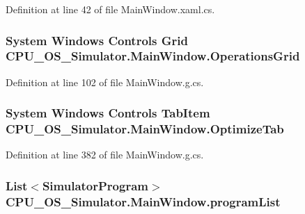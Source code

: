 Definition at line 42 of file Main\+Window.\+xaml.\+cs.

\hypertarget{class_c_p_u___o_s___simulator_1_1_main_window_ae4f2459995eb2f672c0fd3c2248b79fd}{}
\subsubsection[{Operations\+Grid}]{\setlength{\rightskip}{0pt plus 5cm}System Windows Controls Grid C\+P\+U\+\_\+\+O\+S\+\_\+\+Simulator.\+Main\+Window.\+Operations\+Grid\hspace{0.3cm}{\ttfamily [package]}}\label{class_c_p_u___o_s___simulator_1_1_main_window_ae4f2459995eb2f672c0fd3c2248b79fd}


Definition at line 102 of file Main\+Window.\+g.\+cs.

\hypertarget{class_c_p_u___o_s___simulator_1_1_main_window_a47b1359d9e96abf2b0935eb3392405d4}{}
\subsubsection[{Optimize\+Tab}]{\setlength{\rightskip}{0pt plus 5cm}System Windows Controls Tab\+Item C\+P\+U\+\_\+\+O\+S\+\_\+\+Simulator.\+Main\+Window.\+Optimize\+Tab\hspace{0.3cm}{\ttfamily [package]}}\label{class_c_p_u___o_s___simulator_1_1_main_window_a47b1359d9e96abf2b0935eb3392405d4}


Definition at line 382 of file Main\+Window.\+g.\+cs.

\hypertarget{class_c_p_u___o_s___simulator_1_1_main_window_a48fa4dc074c098338a652dbd6a3434c7}{}
\subsubsection[{program\+List}]{\setlength{\rightskip}{0pt plus 5cm}List$<${\bf Simulator\+Program}$>$ C\+P\+U\+\_\+\+O\+S\+\_\+\+Simulator.\+Main\+Window.\+program\+List\hspace{0.3cm}{\ttfamily [private]}}\label{class_c_p_u___o_s___simulator_1_1_main_window_a48fa4dc074c098338a652dbd6a3434c7}


